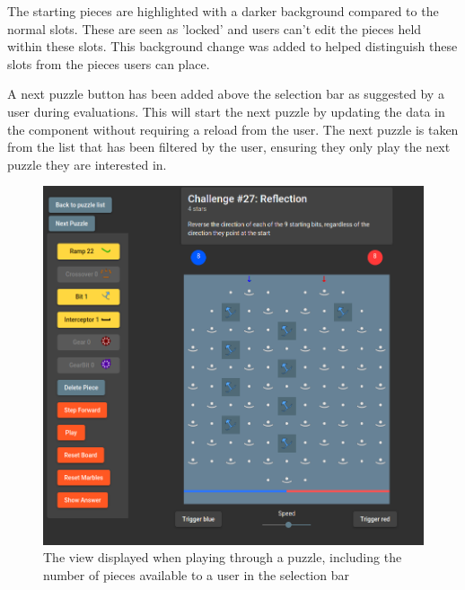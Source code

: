 \documentclass{l4proj}
\begin{document}
The starting pieces are highlighted with a darker background compared to the normal slots. These are seen as 'locked' and users can't edit the pieces held within these slots. This background change was added to helped distinguish these slots from the pieces users can place.


A next puzzle button has been added above the selection bar as suggested by a user during evaluations. This will start the next puzzle by updating the data in the component without requiring a reload from the user. The next puzzle is taken from the list that has been filtered by the user, ensuring they only play the next puzzle they are interested in.

\begin{figure}
    \centering
    \includegraphics[width=0.65\linewidth]{images/puzzle.png}
    \caption{The view displayed when playing through a puzzle, including the number of pieces available to a user in the selection bar}
    \label{fig:puzzle}
\end{figure}
\end{document}
